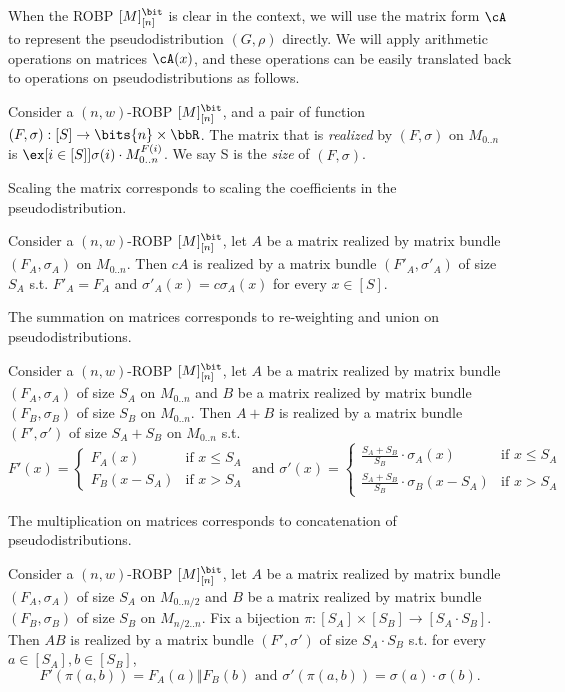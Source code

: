 When the ROBP $[M]_{[n]}^{\bit}$ is clear in the context, we will use the matrix form $\cA$ to represent the pseudodistribution $(G,\rho)$ directly. We will apply arithmetic operations on matrices $\cA(x)$, and these operations can be easily translated back to operations on pseudodistributions as follows.
\begin{definition}
Consider a $(n,w)$-ROBP $[M]_{[n]}^{\bit}$, and a pair of function $(F,\sigma):[S]\to \bits{n}\times\bbR$. The matrix that is \emph{realized} by $(F,\sigma)$ on $M_{0..n}$ is $\ex[{i\in[S]}]{\sigma(i)\cdot M_{0..n}^{F(i)}}$. We say S is the \emph{size} of $(F,\sigma)$.
\end{definition}
\noindent
Scaling the matrix corresponds to scaling the coefficients in the pseudodistribution.
\begin{claim}
Consider a $(n,w)$-ROBP $[M]_{[n]}^{\bit}$, let $A$ be a matrix realized by matrix bundle $(F_A,\sigma_A)$ on $M_{0..n}$. Then $cA$ is realized by a matrix bundle $(F'_A,\sigma'_A)$ of size $S_A$ s.t. $F'_A=F_A$ and $\sigma'_A(x)=c\sigma_A(x)$ for every $x\in[S]$.
\end{claim}
\noindent
The summation on matrices corresponds to re-weighting and union on pseudodistributions.
\begin{claim}
Consider a $(n,w)$-ROBP $[M]_{[n]}^{\bit}$, let $A$ be a matrix realized by matrix bundle $(F_A,\sigma_A)$ of size $S_A$ on $M_{0..n}$ and $B$ be a matrix realized by matrix bundle $(F_B,\sigma_B)$ of size $S_B$ on $M_{0..n}$. Then $A+B$ is realized by a matrix bundle $(F',\sigma')$ of size $S_A+S_B$ on $M_{0..n}$ s.t. 
\[
F'(x) = \begin{cases} F_A(x) &\mbox{if } x \le S_A \\
F_B(x-S_A) & \mbox{if }  x > S_A \end{cases}\textrm{ and }
\sigma'(x) = \begin{cases} \frac{S_A+S_B}{S_B}\cdot \sigma_A(x) &\mbox{if } x \le S_A \\
\frac{S_A+S_B}{S_B}\cdot \sigma_B(x-S_A) & \mbox{if }  x > S_A \end{cases}
\]
\end{claim}
\noindent
The multiplication on matrices corresponds to concatenation of pseudodistributions.
\begin{claim}
Consider a $(n,w)$-ROBP $[M]_{[n]}^{\bit}$, let $A$ be a matrix realized by matrix bundle $(F_A,\sigma_A)$ of size $S_A$ on $M_{0..n/2}$ and $B$ be a matrix realized by matrix bundle $(F_B,\sigma_B)$ of size $S_B$ on $M_{n/2..n}$. Fix a bijection $\pi:[S_A]\times[S_B]\to{[S_A\cdot S_B]}$. Then $AB$ is realized by a matrix bundle $(F',\sigma')$ of size $S_A\cdot S_B$ s.t. for every $a\in[S_A],b\in[S_B]$,
$$F'(\pi(a,b))=F_A(a)\Vert F_B(b)\textrm{ and }\sigma'(\pi(a,b))=\sigma(a)\cdot \sigma(b).$$
\end{claim}

